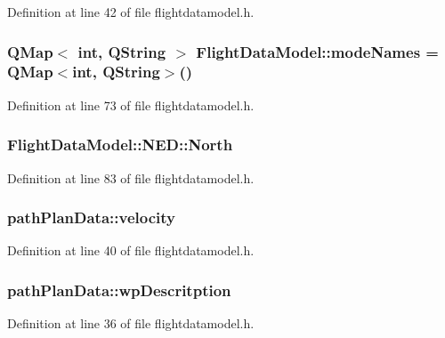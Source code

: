Definition at line 42 of file flightdatamodel.\-h.

\hypertarget{group___path_gae4137f8c1c8d4c53cea911761c13b182}{
\subsubsection[{mode\-Names}]{\setlength{\rightskip}{0pt plus 5cm}Q\-Map$<$ {\bf int}, {\bf Q\-String} $>$ Flight\-Data\-Model\-::mode\-Names = Q\-Map$<${\bf int}, {\bf Q\-String}$>$()\hspace{0.3cm}{\ttfamily [static]}}}\label{group___path_gae4137f8c1c8d4c53cea911761c13b182}


Definition at line 73 of file flightdatamodel.\-h.

\hypertarget{group___path_ga67abe9626bfdec594f13dadb6a8e0507}{
\subsubsection[{North}]{ Flight\-Data\-Model\-::\-N\-E\-D\-::\-North}}\label{group___path_ga67abe9626bfdec594f13dadb6a8e0507}


Definition at line 83 of file flightdatamodel.\-h.

\hypertarget{group___path_ga58910b1bf08e8e02291db4ea420cc383}{
\subsubsection[{velocity}]{ path\-Plan\-Data\-::velocity}}\label{group___path_ga58910b1bf08e8e02291db4ea420cc383}


Definition at line 40 of file flightdatamodel.\-h.

\hypertarget{group___path_gac7fc0b526eac540aa404e9d3d6ee95ef}{
\subsubsection[{wp\-Descritption}]{ path\-Plan\-Data\-::wp\-Descritption}}\label{group___path_gac7fc0b526eac540aa404e9d3d6ee95ef}


Definition at line 36 of file flightdatamodel.\-h.


